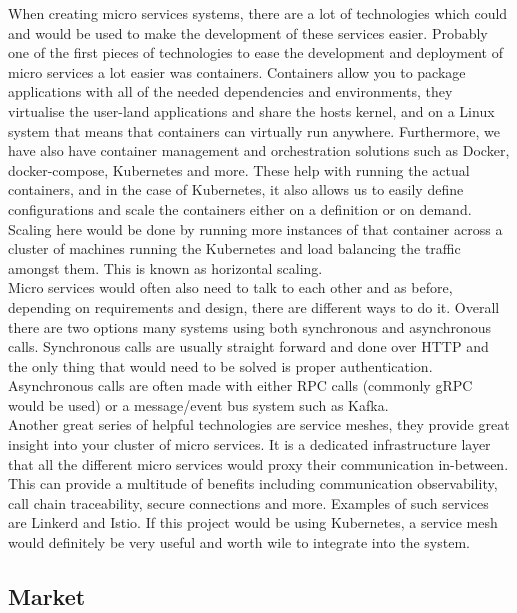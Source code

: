 \documentclass{article}
\newcommand{\vspaceconst}{-2ex}
\begin{document}
\begin{multicols}{2}
  When creating micro services systems, there are a lot of technologies which could and would be used to make the development of these services easier. Probably one of the first pieces of technologies to ease the development and deployment of micro services a lot easier was containers. Containers allow you to package applications with all of the needed dependencies and environments, they virtualise the user-land applications and share the hosts kernel, and on a Linux system that means that containers can virtually run anywhere. Furthermore, we have also have container management and orchestration solutions such as Docker\cite{Docker}, docker-compose\cite{Docker}, Kubernetes\cite{k8s} and more. These help with running the actual containers, and in the case of Kubernetes, it also allows us to easily define configurations and scale the containers either on a definition or on demand. Scaling here would be done by running more instances of that container across a cluster of machines running the Kubernetes and load balancing the traffic amongst them. This is known as horizontal scaling.\\
Micro services would often also need to talk to each other and as before, depending on requirements and design, there are different ways to do it. Overall there are two options many systems using both synchronous and asynchronous calls. Synchronous calls are usually straight forward and done over HTTP and the only thing that would need to be solved is proper authentication. Asynchronous calls are often made with either RPC calls (commonly gRPC\cite{grpc} would be used) or a message/event bus system such as Kafka\cite{kafka}.\\
  Another great series of helpful technologies are service meshes, they provide great insight into your cluster of micro services. It is a dedicated infrastructure layer that all the different micro services would proxy their communication in-between. This can provide a multitude of benefits including communication observability, call chain traceability, secure connections and more. Examples of such services are Linkerd\cite{linkerd} and Istio\cite{istio}. If this project would be using Kubernetes, a service mesh would definitely be very useful and worth wile to integrate into the system.

\subsection{Market} %
\vspace{\vspaceconst}


\end{multicols}
\end{document}
